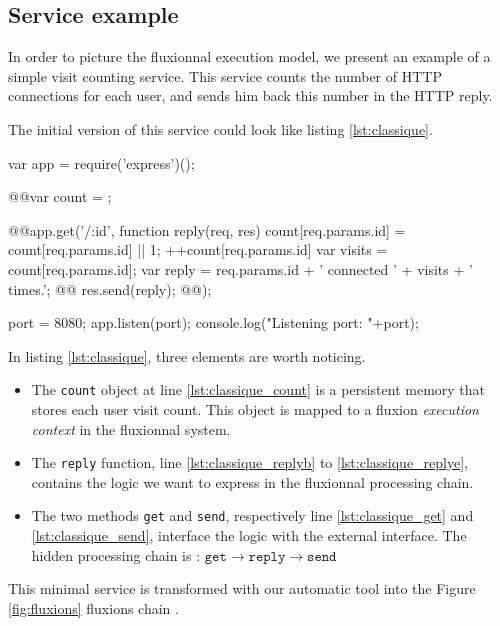 
\subsection{Service example}

In order to picture the fluxionnal execution model, we present an example of a simple visit counting service.
This service counts the number of HTTP connections for each user, and sends him back this number in the HTTP reply.

The initial version of this service could look like listing \ref{lst:classique}.

\begin{code}[Javascript, caption={Initial service},label={lst:classique}]
var app = require('express')();

@\label{lst:classique_count}@var count = {};

@\label{lst:classique_get}\label{lst:classique_replyb}@app.get('/:id', function reply(req, res){
  count[req.params.id] = count[req.params.id]  || 1;
  ++count[req.params.id]
  var visits = count[req.params.id];
  var reply = req.params.id + ' connected ' + visits + ' times.';
@\label{lst:classique_send}@  res.send(reply);
@\label{lst:classique_replye}@});

port = 8080;
app.listen(port);
console.log("Listening port: "+port);
\end{code}

In listing \ref{lst:classique}, three elements are worth noticing.

\begin{itemize}
  \item The \texttt{count} object at line \ref{lst:classique_count} is a persistent memory that stores each user visit count.
  This object is mapped to a fluxion \textit{execution context} in the fluxionnal system.
  \item The \texttt{reply} function, line \ref{lst:classique_replyb} to \ref{lst:classique_replye}, contains the logic we want to express in the fluxionnal processing chain.
  \item The two methods \texttt{get} and \texttt{send}, respectively line \ref{lst:classique_get} and \ref{lst:classique_send}, interface the logic with the external interface.
  The hidden processing chain is : $\texttt{get} \to \texttt{reply} \to \texttt{send}$
\end{itemize}

This minimal service is transformed with our automatic tool into the Figure \ref{fig:fluxions} fluxions chain .

